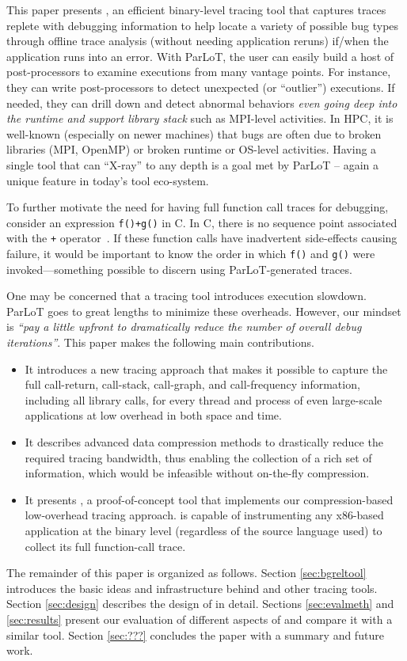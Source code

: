 This paper presents \parlot, an efficient binary-level tracing tool that captures traces 
replete with debugging information to help locate a variety of possible bug types through 
offline trace analysis (without needing application reruns) 
if/when the application runs into an error. 
%
With ParLoT, the user can easily build a host of post-processors to examine
executions from many vantage points.
%
For instance, they can write post-processors
to detect unexpected (or ``outlier'') executions.
%
If needed, they can 
drill down and detect abnormal behaviors {\em even going deep into the runtime and
support library stack} such as MPI-level activities.
%
In HPC, it is well-known (especially on newer machines) that bugs are often due to
broken libraries (MPI, OpenMP) or broken runtime or OS-level activities.
%
Having a single tool that can ``X-ray'' to any depth is a goal met by ParLoT -- again
a unique feature in today's tool eco-system.


To further motivate the need for having full function call
traces for debugging, consider an expression {\tt f()+g()} in C.
%
In C, there is no sequence point associated with the {\tt +}
operator~\cite{sequence-points-in-C}.
%
If these function calls have inadvertent side-effects causing 
failure, it would be important to know the order in which {\tt f()}
and {\tt g()} were invoked---something possible to discern using
ParLoT-generated traces.


One may be concerned that a tracing tool introduces execution slowdown.
%
ParLoT goes to great lengths to minimize these overheads.
%
However, our 
 mindset  is \textit{``pay a little upfront to dramatically reduce the number of overall debug iterations''}. This paper makes the following main contributions.
\begin{itemize}
\item It introduces a new tracing approach that makes it possible to capture the full call-return, call-stack, call-graph, and call-frequency information, including all library calls, for every thread and process of even large-scale applications at low overhead in both space and time.
\item It describes advanced data compression methods to drastically reduce the required tracing bandwidth, thus enabling the collection of a rich set of information, which would be infeasible without on-the-fly compression.
\item It presents \parlot, a proof-of-concept tool that implements our compression-based low-overhead tracing approach. \parlot is capable of instrumenting any x86-based application at the binary level (regardless of the source language used) to collect its full function-call trace.
\end{itemize}
The remainder of this paper is organized as follows. Section \ref{sec:bgreltool} introduces the basic ideas and infrastructure behind \parlot and other tracing tools. Section \ref{sec:design} describes the design of \parlot in detail. Sections \ref{sec:evalmeth} and \ref{sec:results} present our evaluation of different aspects of \parlot and compare it with a similar tool. Section \ref{sec:???} concludes the paper with a summary and future work.


